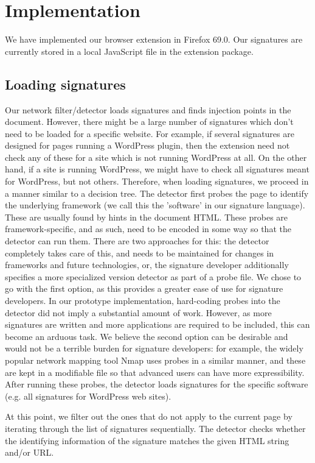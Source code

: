 \section{Implementation}

We have implemented our browser extension in Firefox 69.0. Our signatures are currently stored in a local JavaScript file in the extension package.

\subsection{Loading signatures}
Our network filter/detector loads signatures and finds injection points in the document. However, there might be a large number of signatures which don't need to be loaded for a specific website. For example, if several signatures are designed for pages running a WordPress plugin, then the extension need not check any of these for a site which is not running WordPress at all. On the other hand, if a site is running WordPress, we might have to check all signatures meant for WordPress, but not others. Therefore, when loading signatures, we proceed in a manner similar to a decision tree. The detector first probes the page to identify the underlying framework (we call this the 'software' in our signature language). These are usually found by hints in the document HTML. These probes are framework-specific, and as such, need to be encoded in some way so that the detector can run them. There are two approaches for this: the detector completely takes care of this, and needs to be maintained for changes in frameworks and future technologies, or, the signature developer additionally specifies a more specialized version detector as part of a probe file. We chose to go with the first option, as this provides a greater ease of use for signature developers. In our prototype implementation, hard-coding probes into the detector did not imply a substantial amount of work. However, as more signatures are written and more applications are required to be included, this can become an arduous task. We believe the second option can be desirable and would not be a terrible burden for signature developers: for example, the widely popular network mapping tool Nmap \cite{nMap} uses probes in a similar manner, and these are kept in a modifiable file so that advanced users can have more expressibility. After running these probes, the detector loads signatures for the specific software (e.g. all signatures for WordPress web sites).  

At this point, we filter out the ones that do not apply to the current page by iterating through the list of signatures sequentially. The detector checks whether the identifying information of the signature matches the given HTML string and/or URL.

